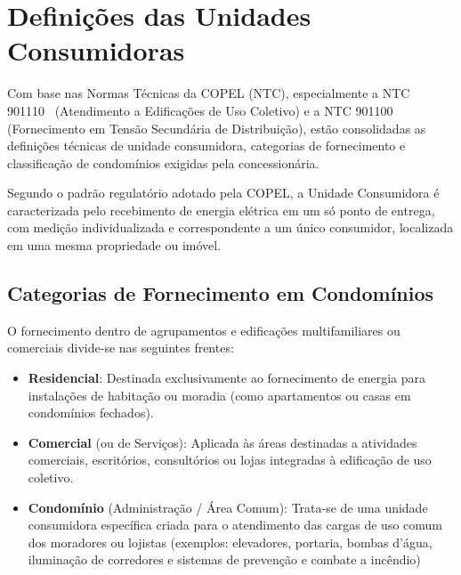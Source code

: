 \documentclass[12pt,openright,oneside,a4paper,brazil]{abntex2}
\begin{document}
\section{Definições das Unidades Consumidoras}

\hspace{1.27cm}Com base nas Normas Técnicas da COPEL (NTC), especialmente a NTC 901110~\cite{ntc901110} (Atendimento a Edificações de Uso Coletivo) e a NTC 901100~\cite{ntc901100} (Fornecimento em Tensão Secundária de Distribuição), estão consolidadas as definições técnicas de unidade consumidora, categorias de fornecimento e classificação de condomínios exigidas pela concessionária.

Segundo o padrão regulatório adotado pela COPEL, a Unidade Consumidora é caracterizada pelo recebimento de energia elétrica em um só ponto de entrega, com medição individualizada e correspondente a um único consumidor, localizada em uma mesma propriedade ou imóvel.

\subsection{Categorias de Fornecimento em Condomínios}

O fornecimento dentro de agrupamentos e edificações multifamiliares ou comerciais divide-se nas seguintes frentes:
\begin{itemize}
    \item \textbf{Residencial}: Destinada exclusivamente ao fornecimento de energia para instalações de habitação ou moradia (como apartamentos ou casas em condomínios fechados).
    \item \textbf{Comercial} (ou de Serviços): Aplicada às áreas destinadas a atividades comerciais, escritórios, consultórios ou lojas integradas à edificação de uso coletivo.
    \item \textbf{Condomínio} (Administração / Área Comum): Trata-se de uma unidade consumidora específica criada para o atendimento das cargas de uso comum dos moradores ou lojistas (exemplos: elevadores, portaria, bombas d'água, iluminação de corredores e sistemas de prevenção e combate a incêndio)

\end{itemize}


\end{document}
